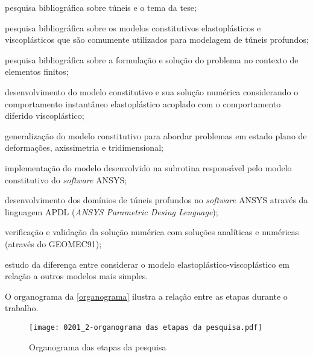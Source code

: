 \begin{alineas}

	\item pesquisa bibliográfica sobre túneis e o tema da tese;
	
	\item pesquisa bibliográfica sobre os modelos constitutivos elastoplásticos e viscoplásticos que são comumente utilizados para modelagem de túneis profundos;
	
	\item pesquisa bibliográfica sobre a formulação e solução do problema no contexto de elementos finitos;
	
	\item desenvolvimento do modelo constitutivo e sua solução numérica considerando o comportamento instantâneo elastoplástico acoplado com o comportamento diferido viscoplástico;
	
	\item generalização do modelo constitutivo para abordar problemas em estado plano de deformações, axissimetria e tridimensional;	
	
	\item implementação do modelo desenvolvido na subrotina responsável pelo modelo constitutivo do \textit{software} ANSYS;	
	
	\item desenvolvimento dos domínios de túneis profundos no \textit{software} ANSYS através da linguagem APDL (\textit{ANSYS Parametric Desing Lenguage});
	
	\item verificação e validação da solução numérica com soluções analíticas e numéricas (através do GEOMEC91);
	
	\item estudo da diferença entre considerar o modelo elastoplástico-viscoplástico em relação a outros modelos mais simples.

\end{alineas}

O organograma da \autoref{organograma} ilustra a relação entre as etapas durante o trabalho.

\begin{figure}[H]
	\begin{center}
		\texttt{[image: 0201\_2-organograma das etapas da pesquisa.pdf]}
	\end{center}
	\caption{\label{organograma}Organograma das etapas da pesquisa}
\end{figure}